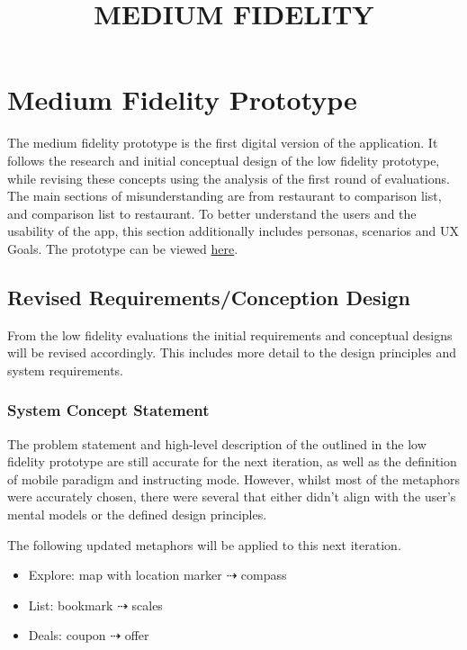\documentclass[a4 paper, 12pt]{article}
\title{MEDIUM FIDELITY}
\begin{document}
\section{Medium Fidelity Prototype}
The medium fidelity prototype is the first digital version of the application. It follows the research and initial conceptual design of the low fidelity prototype, while revising these concepts using the analysis of the first round of evaluations. The main sections of misunderstanding are from restaurant to comparison list, and comparison list to restaurant. To better understand the users and the usability of the app, this section additionally includes personas, scenarios and UX Goals. The prototype can be viewed \href{https://www.figma.com/proto/0WYtAGvFm8aOhxSIDqGJ4R/Medium-Fidelity?node-id=4%3A3&scaling=scale-down}{here}.

    \subsection{Revised Requirements/Conception Design}
    From the low fidelity evaluations the initial requirements and conceptual designs will be revised accordingly. This includes more detail to the design principles and system requirements. 

    \subsubsection*{System Concept Statement}
    The problem statement and high-level description of the outlined in the low fidelity prototype are still accurate for the next iteration, as well as the definition of mobile paradigm and instructing mode. However, whilst most of the metaphors were accurately chosen, there were several that either didn't align with the user's mental models or the defined design principles. 
    
    The following updated metaphors will be applied to this next iteration.
        \begin{itemize}
            \item Explore: map with location marker $\dashrightarrow$ compass
            \item List: bookmark $\dashrightarrow$ scales
            \item Deals: coupon $\dashrightarrow$ offer
        \end{itemize}
\end{document}
